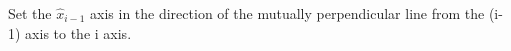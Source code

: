 \documentclass[preview]{standalone}
\begin{document}
\begin{center}
Set the $\hat{x}_{i-1}$ axis in the direction of the mutually perpendicular line from the (i-1) axis to the i axis.
\end{center}
\end{document}
